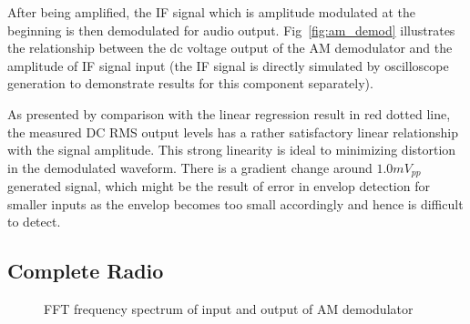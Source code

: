 \documentclass[a4paper,12pt]{article}
\begin{document}
After being amplified, the IF signal which is amplitude modulated at the beginning is then demodulated for audio output.
Fig~\ref{fig:am_demod} illustrates the relationship between the dc voltage output of the AM demodulator and the amplitude of IF signal input (the IF signal is directly simulated by oscilloscope generation to demonstrate results for this component separately).

As presented by comparison with the linear regression result in red dotted line, the measured DC RMS output levels has a rather satisfactory linear relationship with the signal amplitude.
This strong linearity is ideal to minimizing distortion in the demodulated waveform. 
There is a gradient change around $1.0mV_{pp}$ generated signal, which might be the result of error in envelop detection for smaller inputs as the envelop becomes too small accordingly and hence is difficult to detect.

\subsection{Complete Radio}

\vspace{-1.5em}
\begin{figure}[H]
    \centering
    \hspace{0pt}  %
    \caption{FFT frequency spectrum of input and output of AM demodulator}
    \label{fig:final}
\end{figure}
\end{document}

